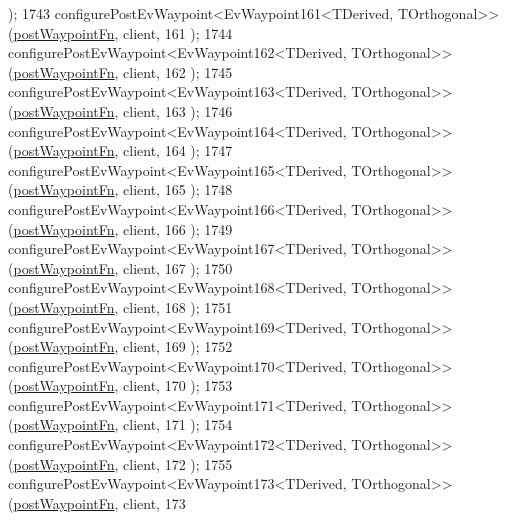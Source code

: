 \begin{DoxyCode}
      );
1743     configurePostEvWaypoint<EvWaypoint161<TDerived, TOrthogonal>>(\hyperlink{classcl__move__base__z_1_1WaypointEventDispatcher_a964a57fcce5d48ec60243230722d8dd7}{postWaypointFn}, client, 161
      );
1744     configurePostEvWaypoint<EvWaypoint162<TDerived, TOrthogonal>>(\hyperlink{classcl__move__base__z_1_1WaypointEventDispatcher_a964a57fcce5d48ec60243230722d8dd7}{postWaypointFn}, client, 162
      );
1745     configurePostEvWaypoint<EvWaypoint163<TDerived, TOrthogonal>>(\hyperlink{classcl__move__base__z_1_1WaypointEventDispatcher_a964a57fcce5d48ec60243230722d8dd7}{postWaypointFn}, client, 163
      );
1746     configurePostEvWaypoint<EvWaypoint164<TDerived, TOrthogonal>>(\hyperlink{classcl__move__base__z_1_1WaypointEventDispatcher_a964a57fcce5d48ec60243230722d8dd7}{postWaypointFn}, client, 164
      );
1747     configurePostEvWaypoint<EvWaypoint165<TDerived, TOrthogonal>>(\hyperlink{classcl__move__base__z_1_1WaypointEventDispatcher_a964a57fcce5d48ec60243230722d8dd7}{postWaypointFn}, client, 165
      );
1748     configurePostEvWaypoint<EvWaypoint166<TDerived, TOrthogonal>>(\hyperlink{classcl__move__base__z_1_1WaypointEventDispatcher_a964a57fcce5d48ec60243230722d8dd7}{postWaypointFn}, client, 166
      );
1749     configurePostEvWaypoint<EvWaypoint167<TDerived, TOrthogonal>>(\hyperlink{classcl__move__base__z_1_1WaypointEventDispatcher_a964a57fcce5d48ec60243230722d8dd7}{postWaypointFn}, client, 167
      );
1750     configurePostEvWaypoint<EvWaypoint168<TDerived, TOrthogonal>>(\hyperlink{classcl__move__base__z_1_1WaypointEventDispatcher_a964a57fcce5d48ec60243230722d8dd7}{postWaypointFn}, client, 168
      );
1751     configurePostEvWaypoint<EvWaypoint169<TDerived, TOrthogonal>>(\hyperlink{classcl__move__base__z_1_1WaypointEventDispatcher_a964a57fcce5d48ec60243230722d8dd7}{postWaypointFn}, client, 169
      );
1752     configurePostEvWaypoint<EvWaypoint170<TDerived, TOrthogonal>>(\hyperlink{classcl__move__base__z_1_1WaypointEventDispatcher_a964a57fcce5d48ec60243230722d8dd7}{postWaypointFn}, client, 170
      );
1753     configurePostEvWaypoint<EvWaypoint171<TDerived, TOrthogonal>>(\hyperlink{classcl__move__base__z_1_1WaypointEventDispatcher_a964a57fcce5d48ec60243230722d8dd7}{postWaypointFn}, client, 171
      );
1754     configurePostEvWaypoint<EvWaypoint172<TDerived, TOrthogonal>>(\hyperlink{classcl__move__base__z_1_1WaypointEventDispatcher_a964a57fcce5d48ec60243230722d8dd7}{postWaypointFn}, client, 172
      );
1755     configurePostEvWaypoint<EvWaypoint173<TDerived, TOrthogonal>>(\hyperlink{classcl__move__base__z_1_1WaypointEventDispatcher_a964a57fcce5d48ec60243230722d8dd7}{postWaypointFn}, client, 173

\end{DoxyCode}
